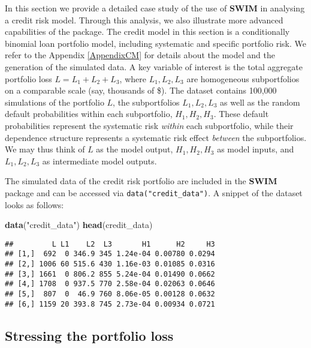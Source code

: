 \documentclass[
]{article}
\newenvironment{Shaded}{\begin{snugshade}}{\end{snugshade}}
\newcommand{\KeywordTok}[1]{\textcolor[rgb]{0.13,0.29,0.53}{\textbf{#1}}}
\newcommand{\NormalTok}[1]{#1}
\newcommand{\StringTok}[1]{\textcolor[rgb]{0.31,0.60,0.02}{#1}}
\begin{document}
In this section we provide a detailed case study of the use of \textbf{SWIM} in analysing a credit risk model. Through this analysis, we also illustrate more advanced capabilities of the package. The credit model in this section is a conditionally binomial loan portfolio model, including systematic and specific portfolio risk. We refer to the Appendix \ref{AppendixCM} for details about the model and the generation of the simulated data. A key variable of interest is the total aggregate portfolio loss \(L = L_1 + L_2 + L_3\), where \(L_1, L_2, L_3\) are homogeneous subportfolios on a comparable scale (say, thousands of \$). The dataset contains 100,000 simulations of the portfolio \(L\), the subportfolios \(L_1, L_2, L_3\) as well as the random default probabilities within each subportfolio, \(H_1, H_2, H_3\). These default probabilities represent the systematic risk \emph{within} each subportfolio, while their dependence structure represents a systematic risk effect \emph{between} the subportfolios. We may thus think of \(L\) as the model output, \(H_1,H_2,H_3\) as model inputs, and \(L_1,L_2,L_3\) as intermediate model outputs.

The simulated data of the credit risk portfolio are included in the \textbf{SWIM} package and can be accessed via \texttt{data("credit\_data")}. A snippet of the dataset looks as follows:

\begin{Shaded}
\begin{Highlighting}[]
\KeywordTok{data}\NormalTok{(}\StringTok{"credit_data"}\NormalTok{)}
\KeywordTok{head}\NormalTok{(credit_data)}
\end{Highlighting}
\end{Shaded}

\begin{verbatim}
##         L L1    L2  L3       H1      H2     H3
## [1,]  692  0 346.9 345 1.24e-04 0.00780 0.0294
## [2,] 1006 60 515.6 430 1.16e-03 0.01085 0.0316
## [3,] 1661  0 806.2 855 5.24e-04 0.01490 0.0662
## [4,] 1708  0 937.5 770 2.58e-04 0.02063 0.0646
## [5,]  807  0  46.9 760 8.06e-05 0.00128 0.0632
## [6,] 1159 20 393.8 745 2.73e-04 0.00934 0.0721
\end{verbatim}

\hypertarget{stressing-the-portfolio-loss}{%
\subsection{Stressing the portfolio loss}\label{stressing-the-portfolio-loss}}
\end{document}
